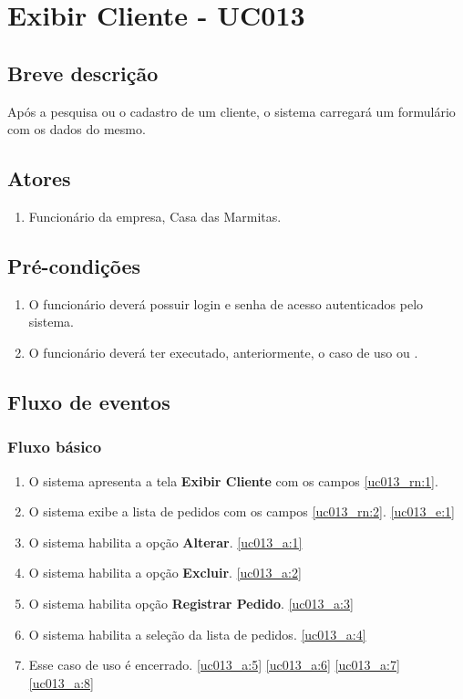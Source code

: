 \chapter{Exibir Cliente - UC013} \label{uc013}

\section{Breve descrição}

Após a pesquisa ou o cadastro de um cliente, o sistema carregará um formulário com os dados do mesmo.

\section{Atores}

\begin{enumerate}
	\item Funcionário da empresa, Casa das Marmitas.
\end{enumerate}

\section{Pré-condições}

\begin{enumerate}
	\item O funcionário deverá possuir login e senha de acesso autenticados pelo sistema.
	\item O funcionário deverá ter executado, anteriormente, o caso de uso  ou .
\end{enumerate}

\section{Fluxo de eventos}

\subsection{Fluxo básico}

\begin{enumerate}[label=P\arabic*]
	\item O sistema apresenta a tela \textbf{Exibir Cliente} com os campos \ref{uc013_rn:1}. \label{uc013_p:1}
	\item O sistema exibe a lista de pedidos com os campos \ref{uc013_rn:2}. \label{uc013_p:2}\ref{uc013_e:1}
	\item O sistema habilita a opção \textbf{Alterar}. \label{uc013_p:3}\ref{uc013_a:1} 
	\item O sistema habilita a opção \textbf{Excluir}. \label{uc013_p:4}\ref{uc013_a:2}
	\item O sistema habilita opção \textbf{Registrar Pedido}. \label{uc013_p:5}\ref{uc013_a:3}
	\item O sistema habilita a seleção da lista de pedidos. \label{uc013_p:6}\ref{uc013_a:4}
	\item Esse caso de uso é encerrado. \label{uc013_p:7}\ref{uc013_a:5} \ref{uc013_a:6} \ref{uc013_a:7}  \ref{uc013_a:8}
\end{enumerate}

